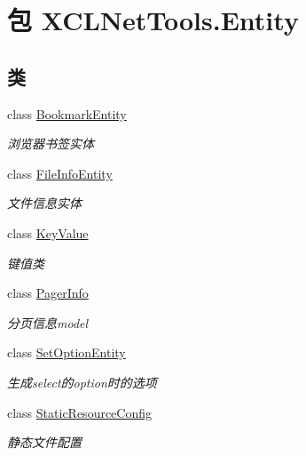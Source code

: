 \hypertarget{namespace_x_c_l_net_tools_1_1_entity}{\section{包 X\-C\-L\-Net\-Tools.\-Entity}
\label{namespace_x_c_l_net_tools_1_1_entity}
}
\subsection*{类}
\begin{DoxyCompactItemize}
\item 
class \hyperlink{class_x_c_l_net_tools_1_1_entity_1_1_bookmark_entity}{Bookmark\-Entity}
\begin{DoxyCompactList}\small\item\em 浏览器书签实体 \end{DoxyCompactList}\item 
class \hyperlink{class_x_c_l_net_tools_1_1_entity_1_1_file_info_entity}{File\-Info\-Entity}
\begin{DoxyCompactList}\small\item\em 文件信息实体 \end{DoxyCompactList}\item 
class \hyperlink{class_x_c_l_net_tools_1_1_entity_1_1_key_value}{Key\-Value}
\begin{DoxyCompactList}\small\item\em 键值类 \end{DoxyCompactList}\item 
class \hyperlink{class_x_c_l_net_tools_1_1_entity_1_1_pager_info}{Pager\-Info}
\begin{DoxyCompactList}\small\item\em 分页信息model \end{DoxyCompactList}\item 
class \hyperlink{class_x_c_l_net_tools_1_1_entity_1_1_set_option_entity}{Set\-Option\-Entity}
\begin{DoxyCompactList}\small\item\em 生成select的option时的选项 \end{DoxyCompactList}\item 
class \hyperlink{class_x_c_l_net_tools_1_1_entity_1_1_static_resource_config}{Static\-Resource\-Config}
\begin{DoxyCompactList}\small\item\em 静态文件配置 \end{DoxyCompactList}\item 

\end{DoxyCompactItemize}
